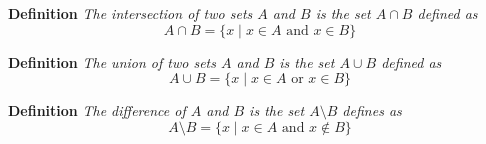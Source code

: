 \textbf{Definition} \textit{The intersection of two sets $A$ and $B$ is the set $A \cap B$ defined as} \[A \cap B = \{x \mid x \in A \text{ and }x \in B\}\]

\textbf{Definition} \textit{The union of two sets $A$ and $B$ is the set $A \cup B$ defined as} \[A \cup B = \{x \mid x \in A \text{ or } x \in B\}\]

\textbf{Definition} \textit{The difference of $A$ and $B$ is the set $A \setminus B$ defines as} \[A \setminus B = \{x \mid x \in A \text{ and } x \notin B\}\]

